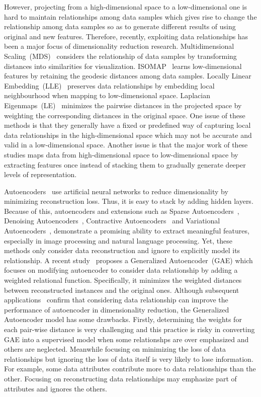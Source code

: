 \documentclass[conference]{IEEEtran}
\begin{document}
	However, projecting from a high-dimensional space to a low-dimensional one is hard to maintain relationships among data samples which gives rise to change the relationship among data samples so as to generate different results of using original and new features. Therefore, recently, exploiting data relationships has been a major focus of dimensionality reduction research. Multidimensional Scaling~(MDS)~\cite{young2013multidimensional} considers the relationship of data samples by transforming distances into similarities for visualization. ISOMAP~\cite{tenenbaum2000global} learns low-dimensional features by retaining the geodesic distances among data samples. Locally Linear Embedding~(LLE)~\cite{roweis2000nonlinear} preserves data relationships by embedding local neighbourhood when mapping to low-dimensional space. Laplacian Eigenmaps~(LE)~\cite{belkin2003laplacian} minimizes the pairwise distances in the projected space by weighting the corresponding distances in the original space. One issue of these methods is that they generally have a fixed or predefined way of capturing local data relationships in the high-dimensional space which may not be accurate and valid in a low-dimensional space. Another issue is that the major work of these studies maps data from high-dimensional space to low-dimensional space by extracting features once instead of stacking them to gradually generate deeper levels of representation.
	

	Autoencoders~\cite{6302929} use artificial neural networks to reduce dimensionality by minimizing reconstruction loss. Thus, it is easy to stack by adding hidden layers. Because of this, autoencoders and extensions such as Sparse Autoencoders~\cite{deng2013sparse}, Denoising Autoencoders~\cite{vincent2008extracting}, Contractive Autoencoders~\cite{rifai2011contractive} and Variational Autoencoders~\cite{goodfellow2014generative}, demonstrate a promising ability to extract meaningful features, especially in image processing and natural language processing. Yet, these methods only consider data reconstruction and ignore to explicitly model its relationship. A recent study~\cite{wang2014generalized} proposes a Generalized Autoencoder~(GAE) which focuses on modifying autoencoder to consider data relationship by adding a weighted relational function. Specifically, it minimizes the weighted distances between reconstructed instances and the original ones. Although subsequent applications~\cite{camlica2015autoencoding, stober2015deep, gao2015learning, Wu:2014, wang2015dimensionality, meng2016research} confirm that considering data relationship can improve the performance of autoencoder in dimensionality reduction, the Generalized Autoencoder model has some drawbacks. Firstly, determining the weights for each pair-wise distance is very challenging and this practice is risky in converting GAE into a supervised model when some relationshps are over emphasized and others are neglected. Meanwhile focusing on minimizing the loss of data relationships but ignoring the loss of data itself is very likely to lose information. For example, some data attributes contribute more to data relationships than the other. Focusing on reconstructing data relationships may emphasize part of attributes and ignores the others.
	
\end{document}
